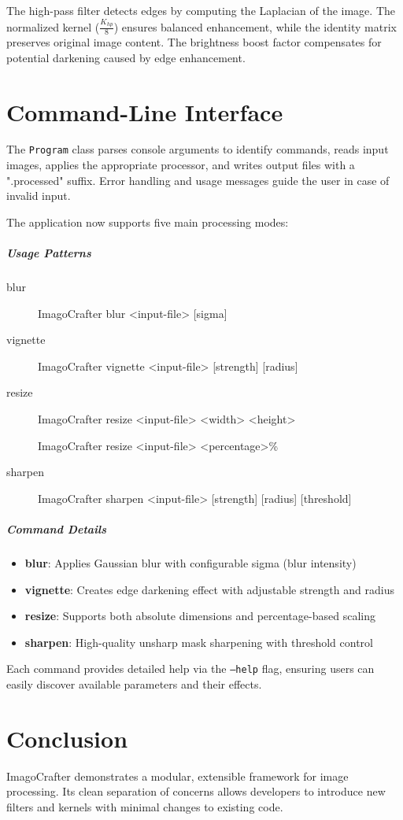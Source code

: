 \documentclass[12pt,a4paper]{report}
\begin{document}
The high-pass filter detects edges by computing the Laplacian of the image. The normalized kernel ($\frac{K_{hp}}{8}$) ensures balanced enhancement, while the identity matrix preserves original image content. The brightness boost factor compensates for potential darkening caused by edge enhancement.

\chapter{Command-Line Interface}
The \texttt{Program} class parses console arguments to identify commands, reads input images, applies the appropriate processor, and writes output files with a ".processed" suffix. Error handling and usage messages guide the user in case of invalid input.

The application now supports five main processing modes:

\paragraph{Usage Patterns}
\begin{description}
  \item[blur]  ImagoCrafter blur <input-file> [sigma]
  \item[vignette]  ImagoCrafter vignette <input-file> [strength] [radius]
  \item[resize]  ImagoCrafter resize <input-file> <width> <height>
  \item[]      ImagoCrafter resize <input-file> <percentage>\%
  \item[sharpen]  ImagoCrafter sharpen <input-file> [strength] [radius] [threshold]
\end{description}

\paragraph{Command Details}
\begin{itemize}
    \item \textbf{blur}: Applies Gaussian blur with configurable sigma (blur intensity)
    \item \textbf{vignette}: Creates edge darkening effect with adjustable strength and radius
    \item \textbf{resize}: Supports both absolute dimensions and percentage-based scaling
    \item \textbf{sharpen}: High-quality unsharp mask sharpening with threshold control
\end{itemize}

Each command provides detailed help via the \texttt{--help} flag, ensuring users can easily discover available parameters and their effects.

\chapter{Conclusion}
ImagoCrafter demonstrates a modular, extensible framework for image processing. Its clean separation of concerns allows developers to introduce new filters and kernels with minimal changes to existing code.
\end{document}
